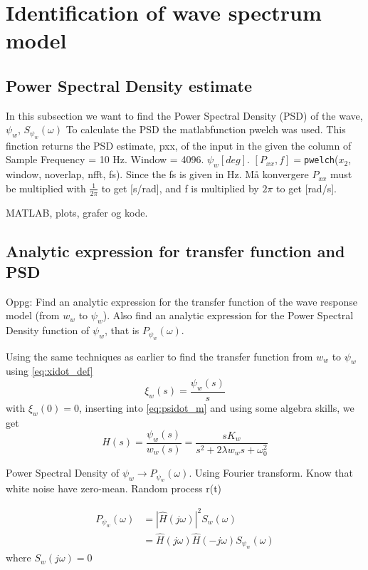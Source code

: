 
\section{Identification of wave spectrum model} \label{sec:part2}

\subsection{Power Spectral Density estimate}
In this subsection we want to find the Power Spectral Density (PSD) of the wave,$\psi_w$, $S_{\psi_w}(\omega)$
\newline
To calculate the PSD the matlabfunction pwelch was used. This finction returns the PSD estimate, pxx, of the input in the given the column of 
Sample Frequency = 10 Hz. Window = 4096. $\psi_w[deg]$. $[P_{xx} , f] = $\texttt{pwelch}($x_2$, window, noverlap, nfft, fs). Since the fs is given in Hz. Må konvergere $P_{xx}$ must be multiplied with $\frac{1}{2\pi}$ to get [s/rad], and f is multiplied by $2\pi$ to get [rad/s].
\newline

MATLAB, plots, grafer og kode.

\subsection{Analytic expression for transfer function and PSD}
Oppg: Find an analytic expression for the transfer function of the wave response model (from $w_w$ to $\psi_w$). Also find an analytic expression for the Power Spectral Density function of $\psi_w$, that is $P_{\psi_w}(\omega)$.

Using the same techniques as earlier to find the transfer function from $w_w$ to $\psi_w$ using \cref{eq:xidot_def} 
\begin{equation*}
    \xi_w(s) = \frac{\psi_w(s)}{s}
\end{equation*}
with $\xi_w(0) = 0$, inserting into \cref{eq:psidot_m} and using some algebra skills, we get
\begin{equation} 
    H(s) =  \frac{\psi_{w}(s)}{w_{w}(s)} = \frac{s K_w}{s^2 + 2\lambda w_w s + \omega_0^2}
\end{equation}
\bigskip

Power Spectral Density of $\psi_w \rightarrow P_{\psi_w}(\omega)$. Using Fourier transform. Know that white noise have zero-mean. Random process r(t) 

\begin{equation}
\begin{split}
    P_{\psi_w}(\omega) &= |\hat{H}(j\omega)|^2 S_w(\omega) \\
    &= \hat{H}(j\omega) \hat{H}(-j\omega) S_{\psi_w}(\omega)
\end{split}
\end{equation}
where $S_w(j\omega) = 0$ 
\newline

